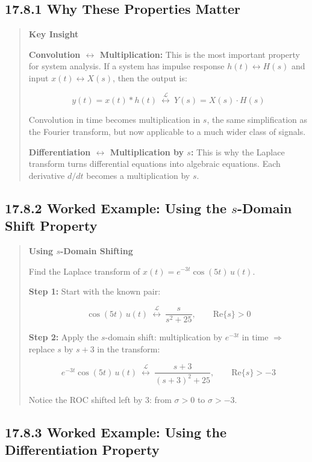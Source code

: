 \documentclass[11pt]{article}
\begin{document}
\subsection*{17.8.1 Why These Properties Matter}

\begin{quote}
\textbf{Key Insight}

\textbf{Convolution $\longleftrightarrow$ Multiplication:} This is the most important property for system analysis. If a system has impulse response $h(t) \leftrightarrow H(s)$ and input $x(t) \leftrightarrow X(s)$, then the output is:

\[y(t) = x(t) * h(t) \ \overset{\mathcal{L}}{\longleftrightarrow}\ Y(s) = X(s) \cdot H(s)\]

Convolution in time becomes multiplication in $s$, the same simplification as the Fourier transform, but now applicable to a much wider class of signals.

\textbf{Differentiation $\longleftrightarrow$ Multiplication by $s$:} This is why the Laplace transform turns differential equations into algebraic equations. Each derivative $d/dt$ becomes a multiplication by $s$.
\end{quote}

\subsection*{17.8.2 Worked Example: Using the $s$-Domain Shift Property}

\begin{quote}
\textbf{Using $s$-Domain Shifting}

Find the Laplace transform of $x(t) = e^{-3t} \cos(5t)\, u(t)$.

\textbf{Step 1:} Start with the known pair:

\[\cos(5t)\, u(t)\ \overset{\mathcal{L}}{\longleftrightarrow}\ \frac{s}{s^2 + 25}, \qquad \text{Re}\{s\} > 0\]

\textbf{Step 2:} Apply the $s$-domain shift: multiplication by $e^{-3t}$ in time $\Rightarrow$ replace $s$ by $s + 3$ in the transform:

\[e^{-3t} \cos(5t)\, u(t)\ \overset{\mathcal{L}}{\longleftrightarrow}\ \frac{s+3}{(s+3)^2 + 25}, \qquad \text{Re}\{s\} > -3\]

Notice the ROC shifted left by 3: from $\sigma > 0$ to $\sigma > -3$.
\end{quote}

\subsection*{17.8.3 Worked Example: Using the Differentiation Property}
\end{document}
